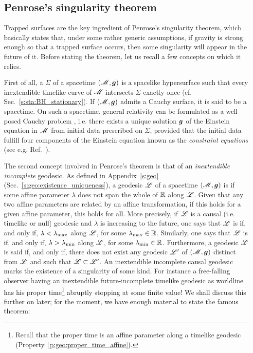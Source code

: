 \subsection{Penrose's singularity theorem}

Trapped surfaces are the key ingredient of Penrose's singularity theorem,
which basically states that, under some rather generic assumptions, if gravity is
strong enough so that a trapped surface occurs, then some singularity will
appear in the future of it.
Before stating the theorem, let us recall a few concepts on which it relies.

First of all, a 
$\Sigma$ of a spacetime $(\mathscr{M},\bm{g})$ is a spacelike
hypersurface such that every inextendible timelike curve of $\mathscr{M}$
intersects $\Sigma$ exactly once (cf. Sec.~\ref{s:sta:BH_stationary}). If $(\mathscr{M},\bm{g})$
admits a Cauchy surface, it is said to be a
 spacetime.
On such a spacetime, general relativity can be formulated as a well posed
Cauchy problem \cite{ChoquG69},
i.e. there exists a unique solution $\bm{g}$ of the Einstein equation
in $\mathscr{M}$ from initial data prescribed on $\Sigma$, provided that the initial data
fulfill four components of the Einstein equation known as the
\emph{constraint equations}
(see e.g. Ref.~\cite{Gourg12}).

The second concept involved in Penrose's theorem is that of
an \emph{inextendible incomplete} geodesic. As defined in
Appendix~\ref{s:geo} (Sec.~\ref{s:geo:existence_uniqueness}), a
geodesic $\mathscr{L}$ of a spacetime $(\mathscr{M},\bm{g})$ is  if some affine parameter $\lambda$ does not
span the whole of $\mathbb{R}$ along $\mathscr{L}$.
Given that any two affine parameters are related by
an affine transformation, if this holds for a given affine parameter, this holds for all.
More precisely, if $\mathscr{L}$ is a causal (i.e. timelike or null) geodesic and $\lambda$ is increasing to the future, one says that $\mathscr{L}$
is  if, and only if, $\lambda < \lambda_{\rm max}$
along $\mathscr{L}$, for some $\lambda_{\rm max}\in\mathbb{R}$.
Similarly, one says that $\mathscr{L}$
is  if, and only if,
$\lambda > \lambda_{\rm min}$ along $\mathscr{L}$, for some $\lambda_{\rm min}\in\mathbb{R}$.
Furthermore, a geodesic $\mathscr{L}$ is said  if, and only if,
there does not exist any geodesic $\mathscr{L}'$ of $(\mathscr{M},\bm{g})$ distinct from $\mathscr{L}$
and such that $\mathscr{L}\subset\mathscr{L}'$. An inextendible incomplete causal geodesic
marks the existence of a singularity of some kind.
For instance a free-falling observer having an
inextendible future-incomplete timelike geodesic as worldline has his proper time\footnote{Recall that
the proper time is an affine parameter along a timelike geodesic (Property~\ref{p:geo:proper_time_affine}).} abruptly
stopping at some finite value!
We shall discuss this further on later; for the moment, we have enough material
to state the famous theorem:

